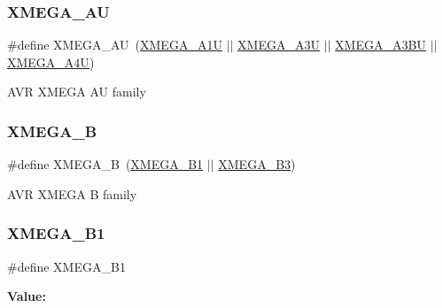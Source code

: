 \subsubsection{\texorpdfstring{XMEGA\_AU}{XMEGA\_AU}}
{\footnotesize\ttfamily \#define X\+M\+E\+G\+A\+\_\+\+AU~(\mbox{\hyperlink{group__xmega__part__macros__group_ga6672329ddee03af905aa378946568b67}{X\+M\+E\+G\+A\+\_\+\+A1U}} $\vert$$\vert$ \mbox{\hyperlink{group__xmega__part__macros__group_gab5232598231cc5c17658e4b7cc5293ec}{X\+M\+E\+G\+A\+\_\+\+A3U}} $\vert$$\vert$ \mbox{\hyperlink{group__xmega__part__macros__group_ga98083f3307fe61cc2377948db87cd708}{X\+M\+E\+G\+A\+\_\+\+A3\+BU}} $\vert$$\vert$ \mbox{\hyperlink{group__xmega__part__macros__group_ga7625edcdd219df905c870d73c1689da6}{X\+M\+E\+G\+A\+\_\+\+A4U}})}

A\+VR X\+M\+E\+GA AU family \mbox{\label{group__xmega__part__macros__group_ga62f2c1c93640237425cb64186ddce219}} 
\subsubsection{\texorpdfstring{XMEGA\_B}{XMEGA\_B}}
{\footnotesize\ttfamily \#define X\+M\+E\+G\+A\+\_\+B~(\mbox{\hyperlink{group__xmega__part__macros__group_gaa2fd55860a1bbc05c6d0d384e7476596}{X\+M\+E\+G\+A\+\_\+\+B1}} $\vert$$\vert$ \mbox{\hyperlink{group__xmega__part__macros__group_ga7385be70af05a3a61864a4fc470fa39d}{X\+M\+E\+G\+A\+\_\+\+B3}})}

A\+VR X\+M\+E\+GA B family \mbox{\label{group__xmega__part__macros__group_gaa2fd55860a1bbc05c6d0d384e7476596}} 
\subsubsection{\texorpdfstring{XMEGA\_B1}{XMEGA\_B1}}
{\footnotesize\ttfamily \#define X\+M\+E\+G\+A\+\_\+\+B1}

{\bfseries Value\+:}
\begin{DoxyCode}{0}
\DoxyCodeLine{( \(\backslash\)}
\DoxyCodeLine{        )}

\end{DoxyCode}
\mbox{\label{group__xmega__part__macros__group_ga7385be70af05a3a61864a4fc470fa39d}} 
